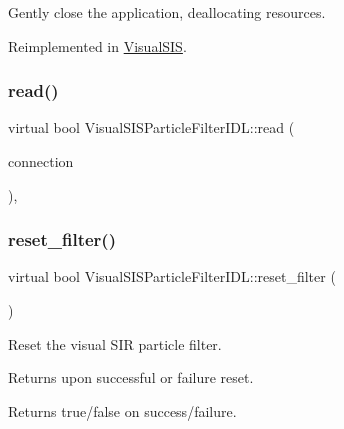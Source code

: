 Gently close the application, deallocating resources. 



Reimplemented in \hyperlink{classVisualSIS_abff835a326f38e95187148d9401d5170}{Visual\+S\+IS}.

\mbox{\label{classVisualSISParticleFilterIDL_aade5ce77926faff0e94ffbf77f20c2c0}} 
\subsubsection{\texorpdfstring{read()}{read()}}
{\footnotesize\ttfamily virtual bool Visual\+S\+I\+S\+Particle\+Filter\+I\+D\+L\+::read (\begin{DoxyParamCaption}\item[{yarp\+::os\+::\+Connection\+Reader \&}]{connection }\end{DoxyParamCaption})\hspace{0.3cm}{\ttfamily [override]}, {\ttfamily [virtual]}}

\mbox{\label{classVisualSISParticleFilterIDL_ad6047accd0fe743bdbd158cb9b6fc11b}} 
\subsubsection{\texorpdfstring{reset\+\_\+filter()}{reset\_filter()}}
{\footnotesize\ttfamily virtual bool Visual\+S\+I\+S\+Particle\+Filter\+I\+D\+L\+::reset\+\_\+filter (\begin{DoxyParamCaption}{ }\end{DoxyParamCaption})\hspace{0.3cm}{\ttfamily [virtual]}}



Reset the visual S\+IR particle filter. 

Returns upon successful or failure reset. \begin{DoxyReturn}{Returns}
true/false on success/failure. 
\end{DoxyReturn}


